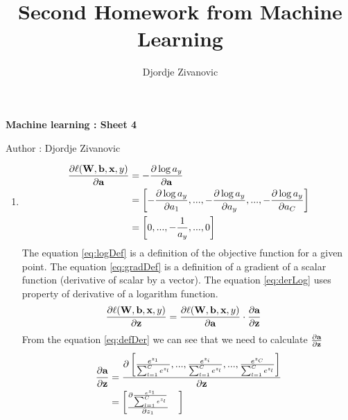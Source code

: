 \documentclass[10pt,a4paper]{article}
\author{Djordje Zivanovic}
\title{Second Homework from Machine Learning}
\begin{document}
\centerline{\large \bf Machine learning : Sheet 4}
\centerline{\large Author : Djordje Zivanovic}
\bigskip
\newcommand{\transpose}[1]{#1 ^ \text{T}}
\newcommand{\mat}[1]{\textbf{\text{{#1}}}}
\newcommand{\vect}[1]{\mat{#1}}
\newcommand{\gradient}[1]{\nabla_{\vect{#1}}}
\newcommand{\der}[1]{\frac{\partial}{\partial #1}}
\newcommand{\numberthis}{\addtocounter{equation}{1}\tag{\theequation}}
\newcommand{\logfun}{\sigma(\transpose{\vect{x}}_i \vect{w})}
\newcommand{\softmaxi}{\frac{e^{z_i}}{\sum_{l=1}^Ce^{z_l}}}
\newcommand{\layersep}{2.5cm}
\newcommand{\layersepH}{6cm}
\newcommand{\layersepP}{7cm}
\newcommand{\layersepB}{9cm}
\begin{enumerate}
\item 
\begin{align}
\frac{\partial \ell (\mat{W}, \vect{b}, \vect{x}, y)}{\partial \vect{a}} 
&= -\frac{\partial \log a_y}{\partial \vect{a}} \label{eq:logDef}\\
&= \left[ -\frac{\partial \log a_y}{\partial a_1}, ..., -\frac{\partial \log a_y}{\partial a_y}, ..., -\frac{\partial \log a_y}{\partial a_C}  \right] \label{eq:gradDef}\\
&= \left[0, ..., -\frac{1}{a_y}, ..., 0\right] \label{eq:derLog}
\end{align}
The equation \ref{eq:logDef} is a definition of the objective function for a given point. The equation \ref{eq:gradDef} is a definition of a gradient of a scalar function (derivative of scalar by a vector). The equation \ref{eq:derLog} uses property of derivative of a logarithm function.
\begin{align}
\frac{\partial \ell (\mat{W}, \vect{b}, \vect{x}, y)}{\partial \vect{z}} 
&=\frac{\partial \ell (\mat{W}, \vect{b}, \vect{x}, y)}{\partial \vect{a}}
\cdot \frac{\partial \vect{a}}{\partial \vect{z}}   \label{eq:defDer}
\end{align}
From the equation \ref{eq:defDer} we can see that we need to calculate $\frac{\partial\vect{a}}{\partial\vect{z}}$
\begin{align}
\frac{\partial \vect{a}}{\partial \vect{z}} 
&=\frac{\partial \left[ \frac{ e^{z_{1}}}{\sum_{l=1}^{C}e^{z_{l}}}, ..., \frac{ e^{z_{i}}}{\sum_{l=1}^{C}e^{z_{l}}},..., \frac{ e^{z_{C}}}{\sum_{l=1}^{C}e^{z_{l}}} \right]}{\partial \vect{z}}  \label{eq:softMax}\\
&=\begin{bmatrix}
    \frac{\partial \frac{ e^{z_{1}}}{\sum_{l=1}^{C}e^{z_{l}}}}{\partial z_1}     & 

\end{bmatrix}
\end{align}
\end{enumerate}
\end{document}
